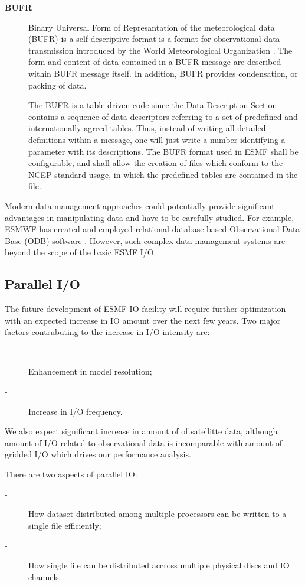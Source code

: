 \begin{description}
\item[\bf BUFR] Binary Universal Form of Represantation of the meteorological 
data (BUFR) is a self-descriptive format is a format for observational data 
transmission introduced by the World Meteorological Organization 
\cite{WMO-BUFR-CREX}. The form and content of data contained in a BUFR 
message are described within BUFR message itself. In addition, BUFR provides 
condensation, or packing of data. 

The BUFR is a table-driven code since the Data Description Section
contains a sequence of data descriptors referring to a set of
predefined and internationally agreed tables. Thus, instead of writing
all detailed definitions within a message, one will just write a
number identifying a parameter with its descriptions. The BUFR format
used in ESMF shall be configurable, and shall allow the creation of
files which conform to the NCEP standard usage, in which the
predefined tables are contained in the file.

\end{description}

Modern data management approaches could potentially provide significant 
advantages in manipulating data and have to be carefully studied.
For example, ESMWF has created and employed relational-database based 
Observational Data Base (ODB) software \cite{ODB}.  However, such complex 
data management systems are beyond the scope of the basic ESMF I/O. 


\subsection{Parallel I/O}

The future development of ESMF IO facility will require further
optimization with an expected increase in IO amount over the next few
years. Two major factors contrubuting to the increase in I/O intensity are:
\begin{description}
\item[-] Enhancement in model resolution;
\item[-] Increase in I/O frequency.
\end{description}
We also expect significant increase in amount of of satellitte data, although 
amount of I/O related to observational data is incomparable with amount of 
gridded I/O which drives our performance analysis. 

There are two aspects of  parallel IO:

\begin{description}
\item[-] How dataset distributed among multiple processors can be
written to a single file efficiently;

\item[-] How single file can be distributed accross multiple physical
discs and IO channels.
\end{description}
 
